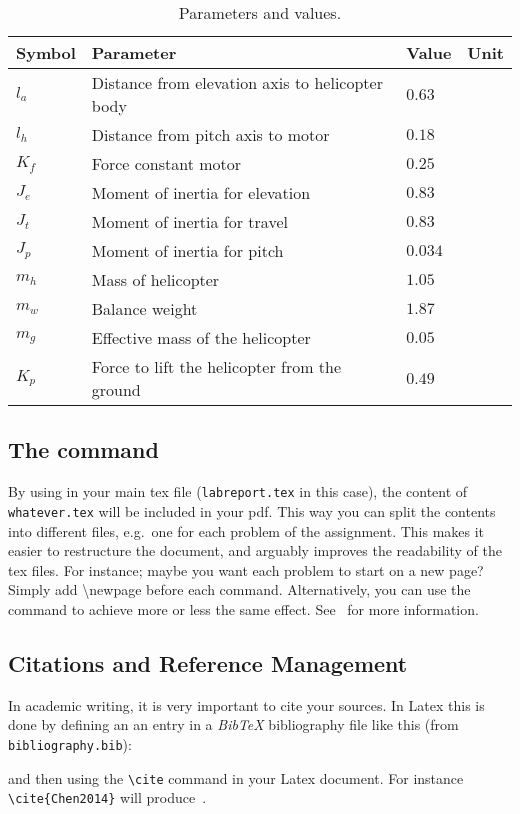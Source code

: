 \begin{table}[tbp]
	\centering
	\caption{Parameters and values.}
	\begin{tabular}{llll}
		\toprule
		Symbol & Parameter & Value & Unit \\
		\midrule
		$l_a$ & Distance from elevation axis to helicopter body & $0.63$ & \meter\\
		$l_h$ & Distance from pitch axis to motor & $0.18$ & \meter\\
		$K_f$ & Force constant motor & $0.25$ & \newton\per\volt\\
		$J_e$ & Moment of inertia for elevation & $0.83$ & \kilogram\usk\meter\squared\\
		$J_t$ & Moment of inertia for travel & $0.83$ & \kilogram\usk\meter\squared\\
		$J_p$ & Moment of inertia for pitch & $0.034$ & \kilogram\usk\meter\squared\\
		$m_h$ & Mass of helicopter & $1.05$ & \kilogram\\
		$m_w$ & Balance weight & $1.87$ & \kilogram\\
		$m_g$ & Effective mass of the helicopter & $0.05$ & \kilogram\\
		$K_p$ & Force to lift the helicopter from the ground & $0.49$ & \newton\\
		\bottomrule
	\end{tabular}
\label{tab:parameters}
\end{table}

\subsection{The  command}
By using  in your main tex file (\texttt{labreport.tex} in this case), the content of \texttt{whatever.tex} will be included in your pdf. This way you can split the contents into different files, e.g.~one for each problem of the assignment. This makes it easier to restructure the document, and arguably improves the readability of the tex files. For instance; maybe you want each problem to start on a new page? Simply add \textbackslash{newpage} before each  command. Alternatively, you can use the  command to achieve more or less the same effect. See~\cite{InputVsInclude} for more information.

\subsection{Citations and Reference Management}
In academic writing, it is very important to cite your sources. In Latex this is done by defining an an entry in a \emph{BibTeX} bibliography file like this (from \texttt{bibliography.bib}):

and then using the \texttt{\textbackslash{cite}} command in your Latex document. For instance \texttt{\textbackslash{cite}\{Chen2014\}} will produce~\cite{Chen2014}.

